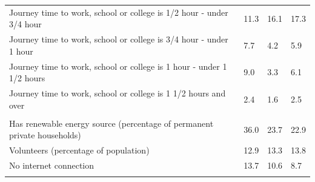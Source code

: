 \documentclass{article}
\begin{document}
\begin{table}[h]
\begin{tabular}{KTTT}
Journey time to work, school or college is 1/2 hour - under 3/4 hour & 11.3& 16.1& 17.3\\
Journey time to work, school or college is 3/4 hour - under 1 hour & 7.7& 4.2& 5.9\\
Journey time to work, school or college is 1 hour - under 1 1/2 hours & 9.0& 3.3& 6.1\\
Journey time to work, school or college is 1 1/2 hours and over & 2.4& 1.6& 2.5\\
\hline
    \\ 
    \hline
Has renewable energy source (percentage of permanent private households) & 36.0& 23.7& 22.9\\
    \hline
Volunteers (percentage of population) & 12.9& 13.3& 13.8\\
    \hline
No internet connection& 13.7& 10.6&  8.7\\
\hline
\end{tabular}
\end{table}
\end{document}
